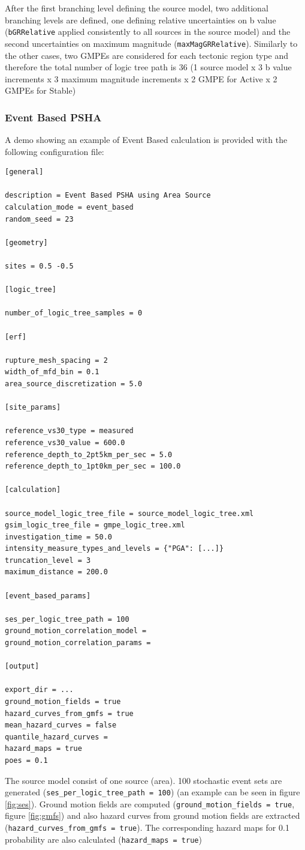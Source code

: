 After the first branching level defining the source model, two 
additional branching levels are defined, one defining
relative uncertainties on b value (\texttt{bGR\-Rel\-a\-tive} applied 
consistently to all sources in the source model)
and the second uncertainties on maximum magnitude (\texttt{maxMagGRRelative}). 
Similarly to the other cases, two GMPEs are considered for each tectonic 
region type and therefore the total number of logic tree path is 36
(1 source model x 3 b value increments x 3 maximum magnitude increments 
x 2 GMPE for Active x 2 GMPEs for Stable)

\subsubsection{Event Based PSHA}
A demo showing an example of Event Based calculation is provided with the 
following configuration file:
\begin{Verbatim}[frame=single, commandchars=\\\{\}, fontsize=\normalsize]
[general]

description = Event Based PSHA using Area Source
calculation_mode = event_based
random_seed = 23

[geometry]

sites = 0.5 -0.5

[logic_tree]

number_of_logic_tree_samples = 0

[erf]

rupture_mesh_spacing = 2
width_of_mfd_bin = 0.1
area_source_discretization = 5.0

[site_params]

reference_vs30_type = measured
reference_vs30_value = 600.0
reference_depth_to_2pt5km_per_sec = 5.0
reference_depth_to_1pt0km_per_sec = 100.0

[calculation]

source_model_logic_tree_file = source_model_logic_tree.xml
gsim_logic_tree_file = gmpe_logic_tree.xml
investigation_time = 50.0
intensity_measure_types_and_levels = {"PGA": [...]}
truncation_level = 3
maximum_distance = 200.0

[event_based_params]

ses_per_logic_tree_path = 100
ground_motion_correlation_model =
ground_motion_correlation_params =

[output]

export_dir = ...
ground_motion_fields = true
hazard_curves_from_gmfs = true
mean_hazard_curves = false
quantile_hazard_curves =
hazard_maps = true
poes = 0.1
\end{Verbatim}
The source model consist of one source (area). 100 stochastic event sets 
are generated (\texttt{ses\_\-per\_\-logic\_\-tree\_\-path = 100}) (an 
example can be seen in figure \ref{fig:ses}). Ground motion fields are 
computed (\texttt{ground\_\-motion\_\-fields = true}, figure \ref{fig:gmfs}) 
and also hazard curves from ground motion fields are
extracted (\texttt{hazard\_\-curves\_\-from\_\-gmfs = true}).
The corresponding hazard maps for 0.1 probability are also calculated
(\texttt{hazard\_\-maps = true})

